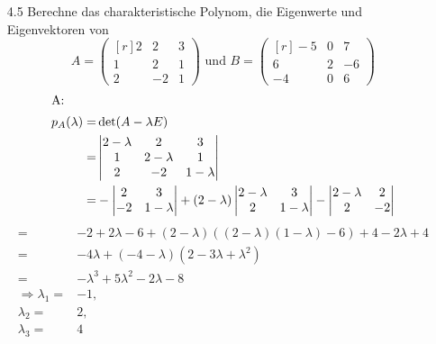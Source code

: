 \documentclass{HM}
\begin{document}
\begin{enumerate}
	\item[4.5] Berechne das charakteristische Polynom, die Eigenwerte und Eigenvektoren von
	$$A=\begin{pmatrix*}[r]
		2&2&3\\
		1&2&1\\
		2&-2&1
	\end{pmatrix*} \text{ und } B=\begin{pmatrix*}[r]
		-5&0&7\\
		6&2&-6\\
		-4&0&6
	\end{pmatrix*}$$
	\begin{align*}
		\intertext{A:}
		p_A(\lambda)=&\det(A -\lambda E)\\
		=&\begin{vmatrix}
			2-\lambda&2&3\\
			1&2-\lambda&1\\
			2&-2&1-\lambda
		\end{vmatrix}\\
		=&-\begin{vmatrix}
			2&3\\
			-2&1-\lambda
		\end{vmatrix}+(2-\lambda)\begin{vmatrix}
			2-\lambda&3\\
			2&1-\lambda
		\end{vmatrix}-\begin{vmatrix}
			2-\lambda&2\\
			2&-2
		\end{vmatrix}\\
	\end{align*}
	\begin{align*}
		=&-2+2\lambda-6+(2-\lambda)((2-\lambda)(1-\lambda)-6)+4-2\lambda+4\\
		=&-4\lambda+(-4-\lambda)(2-3\lambda+\lambda^2)\\
		=&-\lambda^3+5\lambda^2-2\lambda-8\\
		\Rightarrow\lambda_1=&-1,\\
		\lambda_2=& 2,\\
		\lambda_3=& 4\\
	\end{align*}
	

\end{enumerate}
\end{document}
